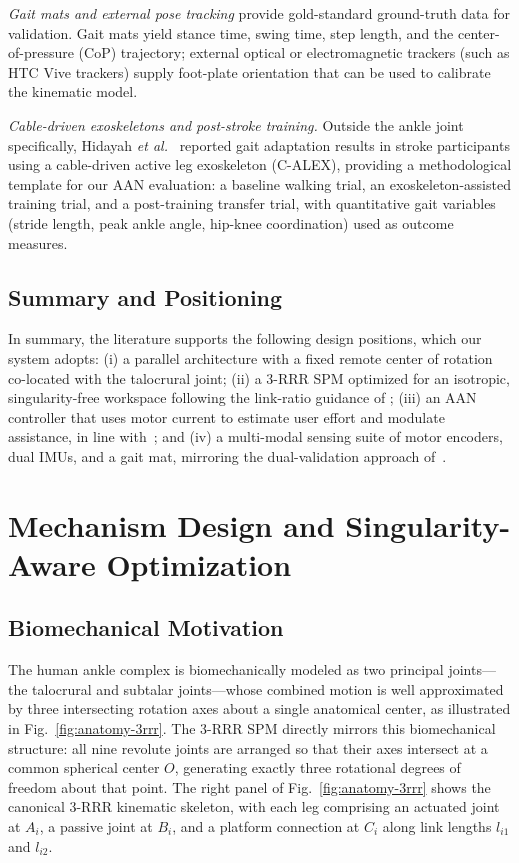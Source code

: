 \documentclass[conference]{IEEEtran}
\begin{document}
\emph{Gait mats and external pose tracking} provide gold-standard ground-truth data for validation. Gait mats yield stance time, swing time, step length, and the center-of-pressure (CoP) trajectory; external optical or electromagnetic trackers (such as HTC Vive trackers) supply foot-plate orientation that can be used to calibrate the kinematic model.

\emph{Cable-driven exoskeletons and post-stroke training.} Outside the ankle joint specifically, Hidayah \emph{et al.}~\cite{hidayah2020calex} reported gait adaptation results in stroke participants using a cable-driven active leg exoskeleton (C-ALEX), providing a methodological template for our AAN evaluation: a baseline walking trial, an exoskeleton-assisted training trial, and a post-training transfer trial, with quantitative gait variables (stride length, peak ankle angle, hip-knee coordination) used as outcome measures.

\subsection{Summary and Positioning}

In summary, the literature supports the following design positions, which our system adopts: (i) a parallel architecture with a fixed remote center of rotation co-located with the talocrural joint; (ii) a 3-RRR SPM optimized for an isotropic, singularity-free workspace following the link-ratio guidance of \cite{saheb2021math}; (iii) an AAN controller that uses motor current to estimate user effort and modulate assistance, in line with~\cite{cai2006implications,marchal2009review,jackson2019heuristic}; and (iv) a multi-modal sensing suite of motor encoders, dual IMUs, and a gait mat, mirroring the dual-validation approach of~\cite{hidayah2020calex,prado2020fog,yue2018wearable}.

\section{Mechanism Design and Singularity-Aware Optimization}
\label{sec:mechanism}

\subsection{Biomechanical Motivation}

The human ankle complex is biomechanically modeled as two principal joints---the talocrural and subtalar joints---whose combined motion is well approximated by three intersecting rotation axes about a single anatomical center, as illustrated in Fig.~\ref{fig:anatomy-3rrr}. The 3-RRR SPM directly mirrors this biomechanical structure: all nine revolute joints are arranged so that their axes intersect at a common spherical center $O$, generating exactly three rotational degrees of freedom about that point. The right panel of Fig.~\ref{fig:anatomy-3rrr} shows the canonical 3-RRR kinematic skeleton, with each leg comprising an actuated joint at $A_i$, a passive joint at $B_i$, and a platform connection at $C_i$ along link lengths $l_{i1}$ and $l_{i2}$.
\end{document}
